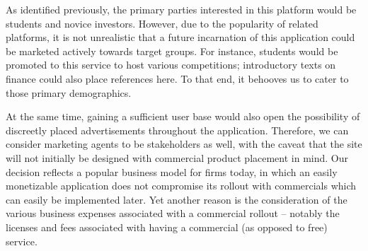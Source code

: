As identified previously, the primary parties interested in
this platform would be students and novice investors. However,
due to the popularity of related platforms, it is not
unrealistic that a future incarnation of this application 
could be marketed actively towards target groups. For instance,
students would be promoted to this service to host various
competitions; introductory texts on finance could also place
references here. To that end, it behooves us to cater to those
primary demographics. 

At the same time, gaining a sufficient user base would also
open the possibility of discreetly placed advertisements 
throughout the application. Therefore, we can consider 
marketing agents to be stakeholders as well, with the caveat
that the site will not initially be designed with commercial
product placement in mind. Our decision reflects a popular 
business model for firms today, in which an easily monetizable
application does not compromise its rollout with commercials
which can easily be implemented later. Yet another reason is 
the consideration of the various business expenses associated 
with a commercial rollout -- notably the licenses and fees
associated with having a commercial (as opposed to free)
service.